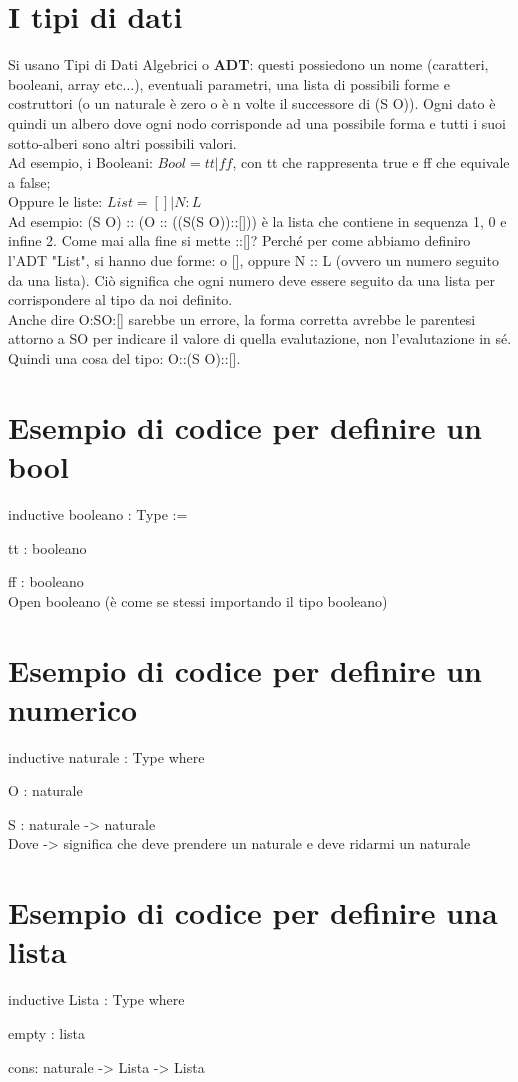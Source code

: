 \documentclass[12pt]{article}
\begin{document}
\section{I tipi di dati}
Si usano Tipi di Dati Algebrici o \textbf{ADT}: questi possiedono un nome (caratteri, booleani, array etc$\dots$), eventuali parametri, una lista di possibili forme e costruttori (o un naturale è zero o è n volte il successore di (S O)). Ogni dato è quindi un albero dove ogni nodo corrisponde ad una possibile forma e tutti i suoi sotto-alberi sono altri possibili valori.
\\
Ad esempio, i Booleani: $Bool = tt|ff$, con tt che rappresenta true e ff che equivale a false;
\\
Oppure le liste: $List = [] | N : L$
\\ Ad esempio: (S O) :: (O :: ((S(S O))::[])) è la lista che contiene in sequenza 1, 0 e infine 2. Come mai alla fine si mette ::[]? Perché per come abbiamo definiro l'ADT "List", si hanno due forme: o [], oppure N :: L (ovvero un numero seguito da una lista). Ciò significa che ogni numero deve essere seguito da una lista per corrispondere al tipo da noi definito.
\\ Anche dire O:SO:[] sarebbe un errore, la forma corretta avrebbe le parentesi attorno a SO per indicare il valore di quella evalutazione, non l'evalutazione in sé. Quindi una cosa del tipo: O::(S O)::[].

\section{Esempio di codice per definire un bool}
inductive booleano : Type :=

    tt : booleano

    ff : booleano
\\Open booleano (è come se stessi importando il tipo booleano)

\section{Esempio di codice per definire un numerico}
inductive naturale : Type where

    O : naturale

    S : naturale -> naturale
\\ Dove -> significa che deve prendere un naturale e deve ridarmi un naturale

\section{Esempio di codice per definire una lista}
inductive Lista : Type where

    empty : lista

    cons: naturale -> Lista -> Lista
\end{document}
